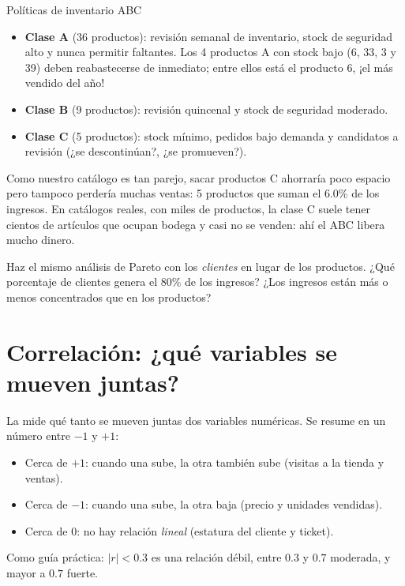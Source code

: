 \begin{negocio}{Políticas de inventario ABC}
\begin{itemize}
  \item \textbf{Clase A} (36 productos): revisión semanal de inventario,
        stock de seguridad alto y nunca permitir faltantes. Los 4 productos A
        con stock bajo (6, 33, 3 y 39) deben reabastecerse de inmediato;
        entre ellos está el producto 6, ¡el más vendido del año!
  \item \textbf{Clase B} (9 productos): revisión quincenal y stock de
        seguridad moderado.
  \item \textbf{Clase C} (5 productos): stock mínimo, pedidos bajo demanda y
        candidatos a revisión (¿se descontinúan?, ¿se promueven?).
\end{itemize}
Como nuestro catálogo es tan parejo, sacar productos C ahorraría poco espacio
pero tampoco perdería muchas ventas: 5 productos que suman el 6.0\% de los
ingresos. En catálogos reales, con miles de productos, la clase C suele
tener cientos de artículos que ocupan bodega y casi no se venden: ahí el ABC
libera mucho dinero.
\end{negocio}

\begin{hazlotu}
Haz el mismo análisis de Pareto con los \emph{clientes} en lugar de los
productos. ¿Qué porcentaje de clientes genera el 80\% de los ingresos? ¿Los
ingresos están más o menos concentrados que en los productos?
\end{hazlotu}

\section{Correlación: ¿qué variables se mueven juntas?}
\label{sec:m4-correlacion}

La  mide qué tanto se mueven juntas dos variables
numéricas. Se resume en un número entre $-1$ y $+1$:
\begin{itemize}
  \item Cerca de $+1$: cuando una sube, la otra también sube (visitas a la
        tienda y ventas).
  \item Cerca de $-1$: cuando una sube, la otra baja (precio y unidades
        vendidas).
  \item Cerca de $0$: no hay relación \emph{lineal} (estatura del cliente y
        ticket).
\end{itemize}
Como guía práctica: $|r| < 0.3$ es una relación débil, entre $0.3$ y $0.7$
moderada, y mayor a $0.7$ fuerte.

